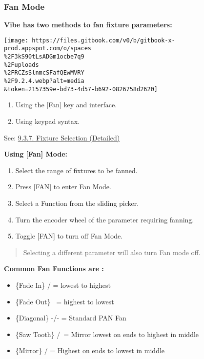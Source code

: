 \documentclass[
]{article}
\begin{document}
\hypertarget{fan-mode}{%
\subsubsection{Fan Mode}\label{fan-mode}}

\textbf{Vibe has two methods to fan fixture parameters:}

\texttt{[image: https://files.gitbook.com/v0/b/gitbook-x-prod.appspot.com/o/spaces\\\%2F3kS90tLsADGm1ocbe7q9\\\%2Fuploads\\\%2FRCZsSlnmcSFafQEwMVRY\\\%2F9.2.4.webp?alt=media\\\&token=2157359e-bd73-4d57-b692-0826758d2620]}

\begin{enumerate}
\def\labelenumi{\arabic{enumi}.}
\item
  Using the {[}Fan{]} key and interface.
\item
  Using keypad syntax.
\end{enumerate}

See: \href{https://vibemanual.compulite.com/programming-basics.html\#fixture-selection-detailed}{9.3.7. Fixture Selection (Detailed)}

\textbf{Using {[}Fan{]} Mode:}

\begin{enumerate}
\def\labelenumi{\arabic{enumi}.}
\item
  Select the range of fixtures to be fanned.
\item
  Press {[}FAN{]} to enter Fan Mode.
\item
  Select a Function from the sliding picker.
\item
  Turn the encoder wheel of the parameter requiring fanning.
\item
  Toggle {[}FAN{]} to turn off Fan Mode.
\end{enumerate}

\begin{quote}
Selecting a different parameter will also turn Fan mode off.
\end{quote}

\textbf{Common Fan Functions are :}

\begin{itemize}
\item
  \{Fade In\} / = lowest to highest
\item
  \{Fade Out\} ~= highest to lowest
\item
  \{Diagonal\} -/- = Standard PAN Fan
\item
  \{Saw Tooth\} /~= Mirror lowest on ends to highest in middle
\item
  \{Mirror\} / = Highest on ends to lowest in middle
\end{itemize}
\end{document}

